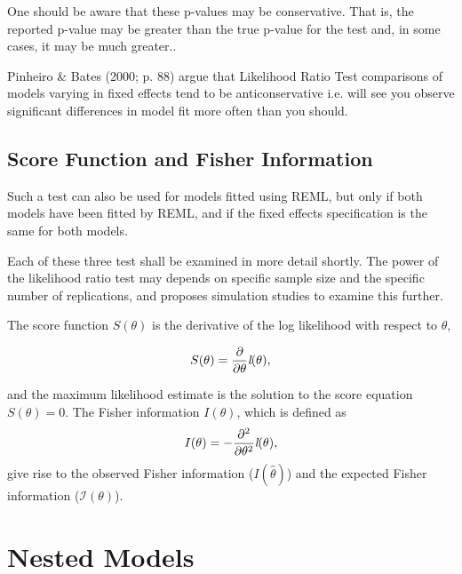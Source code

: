 \documentclass[MAIN.tex]{subfiles}
\begin{document}
	One should be aware that these p-values may be conservative. That is, the reported p-value may be greater than the true p-value for the test and, in some cases, it may be much greater.\citep[pg.87]{pb}.
	
	
	
	Pinheiro \& Bates (2000; p. 88) argue that Likelihood Ratio Test comparisons of models varying in fixed effects tend to be anticonservative i.e. 
	will see you observe significant differences in model fit more often than you should. 
	
	
	
\subsection{Score Function and Fisher Information}
	
Such a test can also be used for models fitted using REML, but only if both models have been fitted by REML, and if the fixed effects specification is the same for both models.
	
Each of these three test shall be examined in more detail shortly. The power of the likelihood ratio test may depends on specific sample size and the specific number of replications, and \citet{ARoy2009} proposes simulation studies to examine this further.
	
The score function $S(\theta)$ is the derivative of the log likelihood with respect to $\theta$,
	
	\[
	S(\theta) = \frac{\partial}{\partial \theta}\emph{l}(\theta),
	\]
	
and the maximum likelihood estimate is the solution to the score equation $	S(\theta) = 0.$	The Fisher information $I(\theta)$, which is defined as
	\[
	I(\theta) = - \frac{\partial^2}{\partial \theta^2}\emph{l}(\theta),
	\]
give rise to the observed Fisher information ($I(\hat{\theta})$) and the expected Fisher information ($\mathcal{I}(\theta)$).
	
\section{Nested Models }
\end{document}
